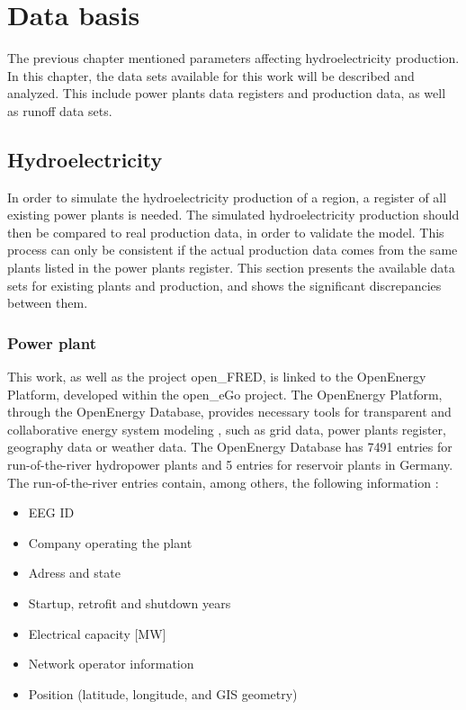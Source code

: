 \chapter{Data basis}
\label{chap:data_basis}

The previous chapter mentioned parameters affecting hydroelectricity production. In this chapter, the data sets available for this work will be described and analyzed. This include power plants data registers and production data, as well as runoff data sets. 

\section{Hydroelectricity}
In order to simulate the hydroelectricity production of a region, a register of all existing power plants is needed. The simulated hydroelectricity production should then be compared to real production data, in order to validate the model. This process can only be consistent if the actual production data comes from the same plants listed in the power plants register. This section presents the available data sets for existing plants and production, and shows the significant discrepancies between them. 

\subsection{Power plant}
\label{sub:hpp_reg}
This work, as well as the project open\_FRED, is linked to the OpenEnergy Platform, developed within the open\_eGo project. The OpenEnergy Platform, through the OpenEnergy Database, provides necessary tools for transparent and collaborative energy system modeling \cite{oedb}, such as grid data, power plants register, geography data or weather data. The OpenEnergy Database has 7491 entries for run-of-the-river hydropower plants and 5 entries for reservoir plants in Germany. The run-of-the-river entries contain, among others, the following information :
\begin{itemize}
\itemsep0em 
 \item EEG ID
 \item Company operating the plant
 \item Adress and state
 \item Startup, retrofit and shutdown years
 \item Electrical capacity [\unit{MW}]
 \item Network operator information
 \item Position (latitude, longitude, and GIS geometry)
\end{itemize}

